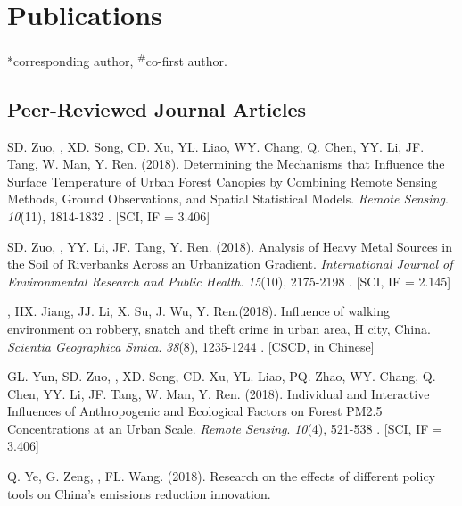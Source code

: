 \newcommand{\Revision}{\textit{under revision}}
\newcommand{\Review}{\textit{under review}}
\newcommand{\CS}{*} %
\newcommand{\CF}{\textsuperscript{\#}} %

\section*{Publications}
\CS corresponding author, \CF co-first author.

\subsection*{Peer-Reviewed Journal Articles}
\begin{etaremune}
\item
    SD. Zuo, \Shaoqing, XD. Song, CD. Xu, YL. Liao, WY. Chang, Q. Chen, YY. Li, JF. Tang, W. Man, Y. Ren. (2018).
    Determining the Mechanisms that Influence the Surface Temperature of Urban Forest Canopies by Combining Remote Sensing Methods, Ground Observations, and Spatial Statistical Models. 
    \textit{Remote Sensing}. \textit{10}(11), 1814-1832
    . [SCI, IF = 3.406]
\item
    SD. Zuo, \Shaoqing, YY. Li, JF. Tang, Y. Ren. (2018).
	Analysis of Heavy Metal Sources in the Soil of Riverbanks Across an Urbanization Gradient.
    \textit{International Journal of Environmental Research and Public Health}. \textit{15}(10), 2175-2198
    . [SCI, IF = 2.145]
\item
    \Shaoqing, HX. Jiang, JJ. Li, X. Su, J. Wu, Y. Ren.(2018).
	Influence of walking environment on robbery, snatch and theft crime in urban area, H city, China.
    \textit{Scientia Geographica Sinica}.  \textit{38}(8), 1235-1244
    . [CSCD, in Chinese]
\item
    GL. Yun, SD. Zuo, \Shaoqing, XD. Song, CD. Xu, YL. Liao, PQ. Zhao, WY. Chang, Q. Chen, YY. Li, JF. Tang, W. Man, Y. Ren. (2018).
	Individual and Interactive Influences of Anthropogenic and Ecological Factors on Forest PM2.5 Concentrations at an Urban Scale.
    \textit{Remote Sensing}. \textit{10}(4), 521-538
    . [SCI, IF = 3.406]
\item
    Q. Ye, G. Zeng, \Shaoqing, FL. Wang. (2018).
	Research on the effects of different policy tools on China’s emissions reduction innovation.

\end{etaremune}
